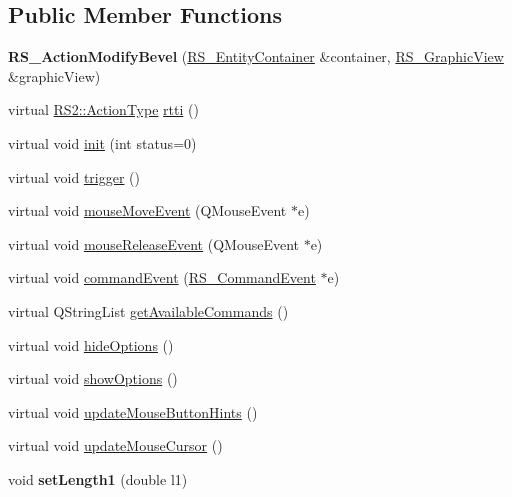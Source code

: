 \subsection*{Public Member Functions}
\begin{DoxyCompactItemize}
\item 
\hypertarget{classRS__ActionModifyBevel_a38220fcae7d6dec95e0cf2943660d993}{{\bfseries R\-S\-\_\-\-Action\-Modify\-Bevel} (\hyperlink{classRS__EntityContainer}{R\-S\-\_\-\-Entity\-Container} \&container, \hyperlink{classRS__GraphicView}{R\-S\-\_\-\-Graphic\-View} \&graphic\-View)}\label{classRS__ActionModifyBevel_a38220fcae7d6dec95e0cf2943660d993}

\item 
virtual \hyperlink{classRS2_afe3523e0bc41fd637b892321cfc4b9d7}{R\-S2\-::\-Action\-Type} \hyperlink{classRS__ActionModifyBevel_a3dc43dcd4b8df754f9fe1f69797747cc}{rtti} ()
\item 
virtual void \hyperlink{classRS__ActionModifyBevel_a96d2054da7b029f4b193bb6fe5079d77}{init} (int status=0)
\item 
virtual void \hyperlink{classRS__ActionModifyBevel_afab2830b31b3730f1ca982bd1d43bb1b}{trigger} ()
\item 
virtual void \hyperlink{classRS__ActionModifyBevel_a78321fe63575753f3f8e425e3adc9a7f}{mouse\-Move\-Event} (Q\-Mouse\-Event $\ast$e)
\item 
virtual void \hyperlink{classRS__ActionModifyBevel_a0b2c7662e04668c937dba923e18f095f}{mouse\-Release\-Event} (Q\-Mouse\-Event $\ast$e)
\item 
virtual void \hyperlink{classRS__ActionModifyBevel_a6b0e7d46e3dc68f3476cf97645e0ce39}{command\-Event} (\hyperlink{classRS__CommandEvent}{R\-S\-\_\-\-Command\-Event} $\ast$e)
\item 
virtual Q\-String\-List \hyperlink{classRS__ActionModifyBevel_a04994a914e2eb745b8c23323ff3a747c}{get\-Available\-Commands} ()
\item 
virtual void \hyperlink{classRS__ActionModifyBevel_a13fa7d1f146ea314db804112f32a0edf}{hide\-Options} ()
\item 
virtual void \hyperlink{classRS__ActionModifyBevel_a887d9143d78e84f9065c214497577ed4}{show\-Options} ()
\item 
virtual void \hyperlink{classRS__ActionModifyBevel_a3d5877700ccc12c4a2e20345d959759c}{update\-Mouse\-Button\-Hints} ()
\item 
virtual void \hyperlink{classRS__ActionModifyBevel_a43d72754ae56ecdecea8e858fe1d86ca}{update\-Mouse\-Cursor} ()
\item 
\hypertarget{classRS__ActionModifyBevel_a27be151f4a52a9f1e26dc2a48f0bddd7}{void {\bfseries set\-Length1} (double l1)}\label{classRS__ActionModifyBevel_a27be151f4a52a9f1e26dc2a48f0bddd7}


\end{DoxyCompactItemize}
